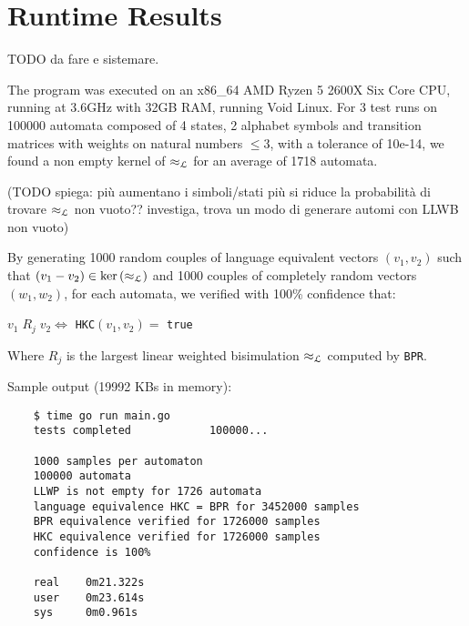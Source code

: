 \section{Runtime Results}

TODO da fare e sistemare.

The program was executed on an x86\_64 AMD Ryzen 5 2600X Six Core CPU, running at 3.6GHz with 32GB RAM, 
running Void Linux. 
For 3 test runs on 100000 automata composed of 4 states, 2 alphabet symbols and transition
matrices with weights on natural numbers $\leq 3$, with a tolerance of 10e-14,
we found a non empty kernel of $\approx_{\mathcal{L}}$ for an average of 1718 automata.

(TODO spiega: più aumentano i simboli/stati più si riduce la probabilità di 
trovare $\approx_{\mathcal{L}}$ non vuoto?? investiga, trova un modo di generare automi con LLWB 
non vuoto)

By generating 1000 random couples of language equivalent vectors $(v_1, v_2)$ such that
$(v_1 - v_2) \in \text{ker}\left(\approx_{\mathcal{L}}\right)$ and 1000 couples of completely random vectors
$(w_1, w_2)$, for each automata, we verified with 100\% confidence that:

\begin{center}
    $v_1 \; R_j \; v_2 \iff$ \texttt{HKC}$(v_1, v_2) =$ \texttt{true}
\end{center}

Where $R_j$ is the largest linear weighted bisimulation $\approx_{\mathcal{L}}$ computed by \texttt{BPR}.


Sample output (19992 KBs in memory):
\begin{verbatim}
    $ time go run main.go 
    tests completed            100000...
    
    1000 samples per automaton
    100000 automata
    LLWP is not empty for 1726 automata
    language equivalence HKC = BPR for 3452000 samples
    BPR equivalence verified for 1726000 samples
    HKC equivalence verified for 1726000 samples
    confidence is 100%
    
    real    0m21.322s
    user    0m23.614s
    sys     0m0.961s
\end{verbatim}